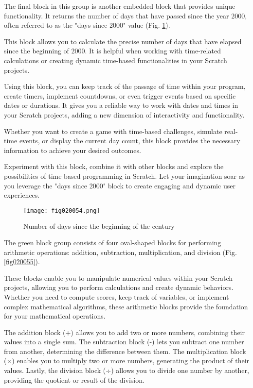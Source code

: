 The final block in this group is another embedded block that provides unique functionality. It returns the number of days that have passed since the year 2000, often referred to as the "days since 2000" value (Fig. \ref{fig020054}).

This block allows you to calculate the precise number of days that have elapsed since the beginning of 2000. It is helpful when working with time-related calculations or creating dynamic time-based functionalities in your Scratch projects.

Using this block, you can keep track of the passage of time within your program, create timers, implement countdowns, or even trigger events based on specific dates or durations. It gives you a reliable way to work with dates and times in your Scratch projects, adding a new dimension of interactivity and functionality.

Whether you want to create a game with time-based challenges, simulate real-time events, or display the current day count, this block provides the necessary information to achieve your desired outcomes.

Experiment with this block, combine it with other blocks and explore the possibilities of time-based programming in Scratch. Let your imagination soar as you leverage the "days since 2000" block to create engaging and dynamic user experiences.

\begin{figure}[H]
   \centering
   \texttt{[image: fig020054.png]}
   \caption{Number of days since the beginning of the century}
\label{fig020054}
\end{figure}

The green block group consists of four oval-shaped blocks for performing arithmetic operations: addition, subtraction, multiplication, and division (Fig. \ref{fig020055}).

These blocks enable you to manipulate numerical values within your Scratch projects, allowing you to perform calculations and create dynamic behaviors. Whether you need to compute scores, keep track of variables, or implement complex mathematical algorithms, these arithmetic blocks provide the foundation for your mathematical operations.

The addition block (+) allows you to add two or more numbers, combining their values into a single sum. The subtraction block (-) lets you subtract one number from another, determining the difference between them. The multiplication block (×) enables you to multiply two or more numbers, generating the product of their values. Lastly, the division block (÷) allows you to divide one number by another, providing the quotient or result of the division.


